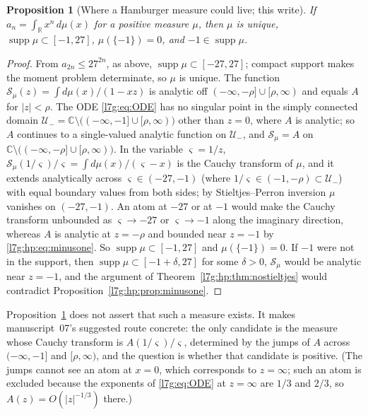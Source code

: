 \documentclass[11pt,letterpaper]{article}
\newtheorem{proposition}[theorem]{Proposition}
\theoremstyle{remark}\newtheorem{remark}[theorem]{Remark}
\newcounter{l7gtrsavedeq}
\begin{document}
\begin{proposition}[Where a Hamburger measure could live; this write]\label{l7g:hp:prop:hamburger}
If $a_n=\int_{\mathbb R}x^n\,d\mu(x)$ for a positive measure $\mu$, then
$\mu$ is unique, $\operatorname{supp}\mu\subset[-1,27]$, $\mu(\{-1\})=0$,
and $-1\in\operatorname{supp}\mu$.
\end{proposition}
\begin{proof}
From $a_{2n}\le27^{2n}$, as above, $\operatorname{supp}\mu\subset[-27,27]$;
compact support makes the moment problem determinate, so $\mu$ is unique.
The function $\mathcal S_\mu(z)=\int d\mu(x)/(1-xz)$ is analytic off
$(-\infty,-\rho]\cup[\rho,\infty)$ and equals $A$ for $|z|<\rho$. The ODE
\eqref{l7g:eq:ODE} has no singular point in the simply connected domain
$\mathcal U_-=\mathbb C\setminus\bigl((-\infty,-1]\cup[\rho,\infty)\bigr)$
other than $z=0$, where $A$ is analytic; so $A$ continues to a single-valued
analytic function on $\mathcal U_-$, and $\mathcal S_\mu=A$ on
$\mathbb C\setminus\bigl((-\infty,-\rho]\cup[\rho,\infty)\bigr)$. In the
variable $\varsigma=1/z$, $\mathcal S_\mu(1/\varsigma)/\varsigma=\int d\mu(x)/(\varsigma-x)$
is the Cauchy transform of $\mu$, and it extends analytically across
$\varsigma\in(-27,-1)$ (where $1/\varsigma\in(-1,-\rho)\subset\mathcal U_-$) with
equal boundary values from both sides; by Stieltjes--Perron inversion
$\mu$ vanishes on $(-27,-1)$. An atom at $-27$ or at $-1$ would make the
Cauchy transform unbounded as $\varsigma\to-27$ or $\varsigma\to-1$ along
the imaginary direction, whereas $A$ is analytic at $z=-\rho$ and bounded
near $z=-1$ by \eqref{l7g:hp:eq:minusone}. So
$\operatorname{supp}\mu\subset[-1,27]$ and $\mu(\{-1\})=0$. If $-1$ were not
in the support, then $\operatorname{supp}\mu\subset[-1+\delta,27]$ for some
$\delta>0$, $\mathcal S_\mu$ would be analytic near $z=-1$, and the argument of
Theorem~\ref{l7g:hp:thm:nostieltjes} would contradict
Proposition~\ref{l7g:hp:prop:minusone}.
\end{proof}
Proposition~\ref{l7g:hp:prop:hamburger} does not assert that such a
measure exists. It makes manuscript~07's suggested route concrete: the only
candidate is the measure whose Cauchy transform is $A(1/\varsigma)/\varsigma$,
determined by the jumps of $A$ across $(-\infty,-1]$ and $[\rho,\infty)$,
and the question is whether that candidate is positive. (The jumps cannot
see an atom at $x=0$, which corresponds to $z=\infty$; such an atom is
excluded because the exponents of \eqref{l7g:eq:ODE} at $z=\infty$ are
$1/3$ and $2/3$, so $A(z)=O(|z|^{-1/3})$ there.)
\end{document}
